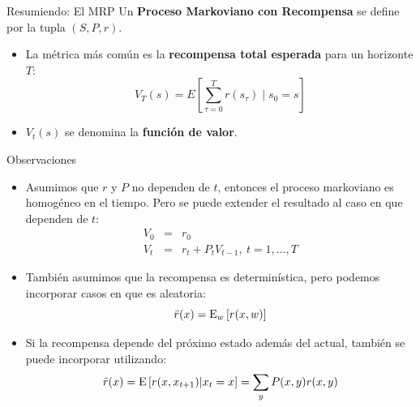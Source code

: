 \documentclass[xcolor=dvipsnames]{beamer}
\begin{document}
\begin{frame}{Resumiendo: El MRP}
Un \textbf{Proceso Markoviano con Recompensa} se define por la tupla $(S, P, r)$.

\begin{itemize}
    \item La métrica más común es la \textbf{recompensa total esperada} para un horizonte $T$:
    \[ V_T(s) = E \left[ \sum_{\tau=0}^T r(s_\tau) \mid s_0 = s \right] \]
    \item $V_t(s)$ se denomina la \textbf{funci\'on de valor}.
\end{itemize}

\end{frame}

\begin{frame}{Observaciones}
\begin{itemize}
\item Asumimos que $r$ y $P$ no dependen de $t$, entonces el proceso markoviano es homogéneo en el tiempo. Pero se puede extender el resultado al caso en que dependen de $t$: 
$$
\begin{array}{ccl}
V_0 &=& r_0 \\
V_t & = & r_t+ P_t V_{t-1},~t = 1,...,T
\end{array}
$$
\item<2-> También asumimos que la recompensa es determinística, pero podemos incorporar casos en que es aleatoria:                $$
\bar{r}(x) = {\rm E}_w\left[r(x,w)\right]
$$                          
\item<3-> Si la recompensa depende del próximo estado además del actual, también se puede incorporar utilizando: 
$$
\bar{r}(x) = {\rm E}\left[r(x,x_{t+1})| x_t = x\right] = \sum_y P(x,y)r(x,y)
$$ 
\end{itemize}
\end{frame}

\end{document}
